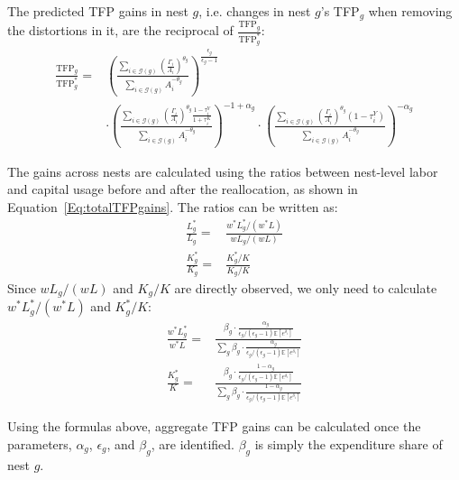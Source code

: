 \documentclass[12pt]{article}
\begin{document}
The predicted TFP gains in nest $g$, i.e. changes in nest $g$'s TFP$_g$ when removing the distortions in it, are the reciprocal of $\frac{\text{TFP}_g}{\text{TFP}_g^*}$:
\begin{align}
\frac{\text{TFP}_g}{\text{TFP}_g^*}=& \left( \frac{\sum_{i\in\mathcal{G}(g)}\left( \frac{\Gamma_i}{A_i} \right)^{\theta_g}}{\sum_{i \in \mathcal{G}(g)} A_i^{-\theta_g}} \right)^{\frac{\epsilon_g}{\epsilon_g-1}} \label{Eq:TFPgainsG}\\
& \cdot \left( \frac{\sum_{i\in\mathcal{G}(g)}\left( \frac{\Gamma_i}{A_i} \right)^{\theta_g} \frac{1-\tau_i^Y}{1+\tau_i^K}}{\sum_{i \in \mathcal{G}(g)} A_i^{-\theta_g}} \right)^{-1+\alpha_g} \cdot \left( \frac{\sum_{i\in\mathcal{G}(g)}\left( \frac{\Gamma_i}{A_i} \right)^{\theta_g} (1-\tau_i^Y)}{\sum_{i \in \mathcal{G}(g)} A_i^{-\theta_g}}\right)^{-\alpha_g} \nonumber
\end{align}

The gains across nests are calculated using the ratios between nest-level labor and capital usage before and after the reallocation, as shown in Equation~\eqref{Eq:totalTFPgains}. The ratios can be written as:
\begin{align*}
\frac{L_g^*}{L_g}=&\frac{w^*L_g^*/(w^*L)}{wL_g/(wL)}\\
\frac{K_g^*}{K_g}=&\frac{K_g^*/K}{K_g/K}
\end{align*}
Since $wL_g/(wL)$ and $K_g/K$ are directly observed, we only need to calculate $w^*L_g^*/(w^*L)$ and $K_g^*/K$:
\begin{align*}
\frac{w^*L_g^*}{w^*L}=&\frac{\beta_g\cdot\frac{\alpha_g}{\epsilon_g/(\epsilon_g-1)\mathbb{E}[e^{\delta_i}]} }{\sum_g \beta_g\cdot\frac{\alpha_g}{\epsilon_g/(\epsilon_g-1)\mathbb{E}[e^{\delta_i}]} }\\
\frac{K_g^*}{K}=&\frac{\beta_g\cdot\frac{1-\alpha_g}{\epsilon_g/(\epsilon_g-1)\mathbb{E}[e^{\delta_i}]} }{\sum_g \beta_g\cdot\frac{1-\alpha_g}{\epsilon_g/(\epsilon_g-1)\mathbb{E}[e^{\delta_i}]} }
\end{align*}
  
Using the formulas above, aggregate TFP gains can be calculated once the parameters, $\alpha_g$, $\epsilon_g$, and $\beta_g$, are identified. $\beta_g$ is simply the expenditure share of nest $g$. %
\end{document}
